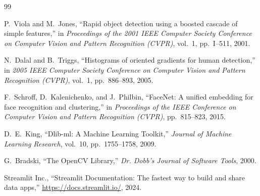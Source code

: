 \documentclass[12pt,a4paper]{article}
\begin{document}
\begin{thebibliography}{99}

P.~Viola and M.~Jones, ``Rapid object detection using a boosted cascade of simple features,'' in \emph{Proceedings of the 2001 IEEE Computer Society Conference on Computer Vision and Pattern Recognition (CVPR)}, vol.~1, pp.~I--511, 2001.

N.~Dalal and B.~Triggs, ``Histograms of oriented gradients for human detection,'' in \emph{2005 IEEE Computer Society Conference on Computer Vision and Pattern Recognition (CVPR)}, vol.~1, pp.~886--893, 2005.

F.~Schroff, D.~Kalenichenko, and J.~Philbin, ``FaceNet: A unified embedding for face recognition and clustering,'' in \emph{Proceedings of the IEEE Conference on Computer Vision and Pattern Recognition (CVPR)}, pp.~815--823, 2015.

D.~E.~King, ``Dlib-ml: A Machine Learning Toolkit,'' \emph{Journal of Machine Learning Research}, vol.~10, pp.~1755--1758, 2009.

G.~Bradski, ``The OpenCV Library,'' \emph{Dr. Dobb's Journal of Software Tools}, 2000.

Streamlit Inc., ``Streamlit Documentation: The fastest way to build and share data apps,'' \url{https://docs.streamlit.io/}, 2024.

\end{thebibliography}
\end{document}

